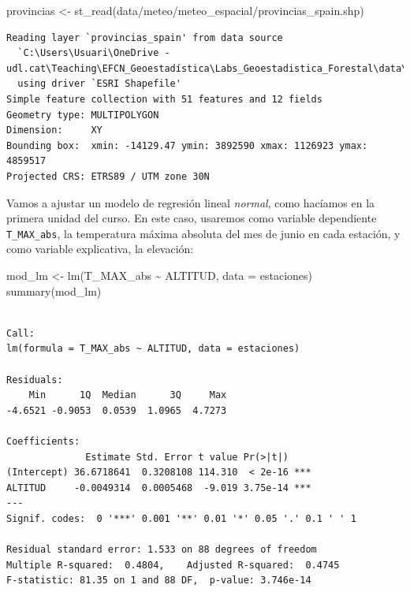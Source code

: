 \documentclass[
  letterpaper,
  DIV=11,
  numbers=noendperiod]{scrreprt}
\newenvironment{Shaded}{\begin{snugshade}}{\end{snugshade}}
\newcommand{\AttributeTok}[1]{\textcolor[rgb]{0.40,0.45,0.13}{#1}}
\newcommand{\FunctionTok}[1]{\textcolor[rgb]{0.28,0.35,0.67}{#1}}
\newcommand{\NormalTok}[1]{\textcolor[rgb]{0.00,0.23,0.31}{#1}}
\newcommand{\OtherTok}[1]{\textcolor[rgb]{0.00,0.23,0.31}{#1}}
\newcommand{\SpecialCharTok}[1]{\textcolor[rgb]{0.37,0.37,0.37}{#1}}
\newcommand{\StringTok}[1]{\textcolor[rgb]{0.13,0.47,0.30}{#1}}
\begin{document}
\begin{Shaded}
\begin{Highlighting}[]
\NormalTok{provincias }\OtherTok{\textless{}{-}} \FunctionTok{st\_read}\NormalTok{(}\StringTok{\textquotesingle{}data/meteo/meteo\_espacial/provincias\_spain.shp\textquotesingle{}}\NormalTok{) }
\end{Highlighting}
\end{Shaded}

\begin{verbatim}
Reading layer `provincias_spain' from data source 
  `C:\Users\Usuari\OneDrive - udl.cat\Teaching\EFCN_Geoestadística\Labs_Geoestadistica_Forestal\data\meteo\meteo_espacial\provincias_spain.shp' 
  using driver `ESRI Shapefile'
Simple feature collection with 51 features and 12 fields
Geometry type: MULTIPOLYGON
Dimension:     XY
Bounding box:  xmin: -14129.47 ymin: 3892590 xmax: 1126923 ymax: 4859517
Projected CRS: ETRS89 / UTM zone 30N
\end{verbatim}

Vamos a ajustar un modelo de regresión lineal \emph{normal}, como
hacíamos en la primera unidad del curso. En este caso, usaremos como
variable dependiente \texttt{T\_MAX\_abs}, la temperatura máxima
absoluta del mes de junio en cada estación, y como variable explicativa,
la elevación:

\begin{Shaded}
\begin{Highlighting}[]
\NormalTok{mod\_lm }\OtherTok{\textless{}{-}} \FunctionTok{lm}\NormalTok{(T\_MAX\_abs }\SpecialCharTok{\textasciitilde{}}\NormalTok{ ALTITUD, }\AttributeTok{data =}\NormalTok{ estaciones)}
\FunctionTok{summary}\NormalTok{(mod\_lm)}
\end{Highlighting}
\end{Shaded}

\begin{verbatim}

Call:
lm(formula = T_MAX_abs ~ ALTITUD, data = estaciones)

Residuals:
    Min      1Q  Median      3Q     Max 
-4.6521 -0.9053  0.0539  1.0965  4.7273 

Coefficients:
              Estimate Std. Error t value Pr(>|t|)    
(Intercept) 36.6718641  0.3208108 114.310  < 2e-16 ***
ALTITUD     -0.0049314  0.0005468  -9.019 3.75e-14 ***
---
Signif. codes:  0 '***' 0.001 '**' 0.01 '*' 0.05 '.' 0.1 ' ' 1

Residual standard error: 1.533 on 88 degrees of freedom
Multiple R-squared:  0.4804,    Adjusted R-squared:  0.4745 
F-statistic: 81.35 on 1 and 88 DF,  p-value: 3.746e-14
\end{verbatim}
\end{document}
